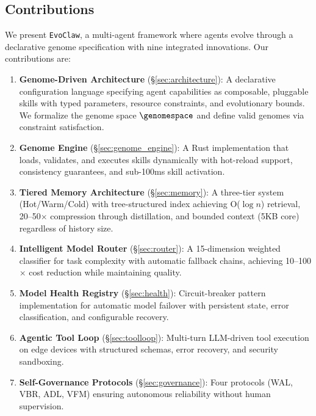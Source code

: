 \documentclass{article}
\newcommand{\evoclaw}{\texttt{EvoClaw}\xspace}
\begin{document}
\subsection{Contributions}

We present \evoclaw{}, a multi-agent framework where agents evolve through a declarative genome specification with nine integrated innovations. Our contributions are:

\begin{enumerate}[leftmargin=*]
    \item \textbf{Genome-Driven Architecture} (\S\ref{sec:architecture}): A declarative configuration language specifying agent capabilities as composable, pluggable skills with typed parameters, resource constraints, and evolutionary bounds. We formalize the genome space $\genomespace$ and define valid genomes via constraint satisfaction.
    
    \item \textbf{Genome Engine} (\S\ref{sec:genome_engine}): A Rust implementation that loads, validates, and executes skills dynamically with hot-reload support, consistency guarantees, and sub-100ms skill activation.
    
    \item \textbf{Tiered Memory Architecture} (\S\ref{sec:memory}): A three-tier system (Hot/Warm/Cold) with tree-structured index achieving O($\log n$) retrieval, 20--50$\times$ compression through distillation, and bounded context (5KB core) regardless of history size.
    
    \item \textbf{Intelligent Model Router} (\S\ref{sec:router}): A 15-dimension weighted classifier for task complexity with automatic fallback chains, achieving 10--100$\times$ cost reduction while maintaining quality.
    
    \item \textbf{Model Health Registry} (\S\ref{sec:health}): Circuit-breaker pattern implementation for automatic model failover with persistent state, error classification, and configurable recovery.
    
    \item \textbf{Agentic Tool Loop} (\S\ref{sec:toolloop}): Multi-turn LLM-driven tool execution on edge devices with structured schemas, error recovery, and security sandboxing.
    
    \item \textbf{Self-Governance Protocols} (\S\ref{sec:governance}): Four protocols (WAL, VBR, ADL, VFM) ensuring autonomous reliability without human supervision.
    

\end{enumerate}
\end{document}
